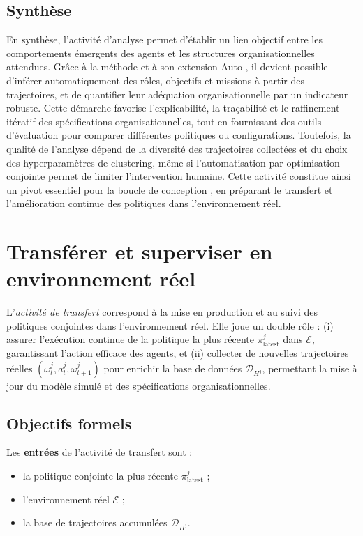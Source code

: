 \section{Synthèse}

En synthèse, l’activité d’analyse permet d’établir un lien objectif entre les comportements émergents des agents et les structures organisationnelles attendues. Grâce à la méthode  et à son extension Auto-, il devient possible d’inférer automatiquement des rôles, objectifs et missions à partir des trajectoires, et de quantifier leur adéquation organisationnelle par un indicateur robuste. Cette démarche favorise l’explicabilité, la traçabilité et le raffinement itératif des spécifications organisationnelles, tout en fournissant des outils d’évaluation pour comparer différentes politiques ou configurations. Toutefois, la qualité de l’analyse dépend de la diversité des trajectoires collectées et du choix des hyperparamètres de clustering, même si l’automatisation par optimisation conjointe permet de limiter l’intervention humaine. Cette activité constitue ainsi un pivot essentiel pour la boucle de conception , en préparant le transfert et l’amélioration continue des politiques dans l’environnement réel.


\clearpage
\thispagestyle{empty}
\null
\newpage

\chapter{Transférer et superviser en environnement réel}
\label{chap:transferring}

L'\textit{activité de transfert} correspond à la mise en production et au suivi des politiques conjointes dans l’environnement réel.
Elle joue un double rôle : (i) assurer l’exécution continue de la politique la plus récente $\pi^j_{\text{latest}}$ dans $\mathcal{E}$, garantissant l’action efficace des agents, et (ii) collecter de nouvelles trajectoires réelles $(\omega^j_t, a^j_t, \omega^j_{t+1})$ pour enrichir la base de données $\mathcal{D}_{H^j}$, permettant la mise à jour du modèle simulé et des spécifications organisationnelles.

\section*{Objectifs formels}

Les \textbf{entrées} de l’activité de transfert sont :
\begin{itemize}
    \item la politique conjointe la plus récente $\pi^j_{\text{latest}}$ ;
    \item l’environnement réel $\mathcal{E}$ ;
    \item la base de trajectoires accumulées $\mathcal{D}_{H^j}$.
\end{itemize}

